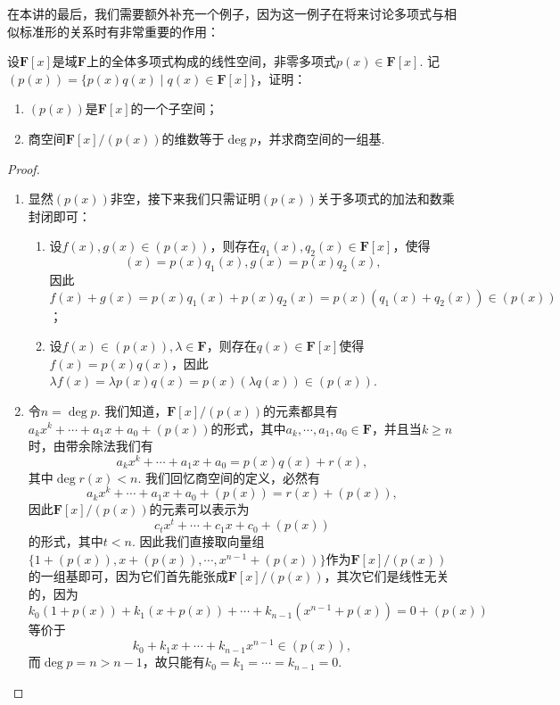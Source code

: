 在本讲的最后，我们需要额外补充一个例子，因为这一例子在将来讨论多项式与相似标准形的关系时有非常重要的作用：
\begin{example} \label{ex:14:多项式域扩张}
    设$\mathbf{F}[x]$是域$\mathbf{F}$上的全体多项式构成的线性空间，非零多项式$p(x)\in \mathbf{F}[x]$. 记$(p(x))=\{p(x)q(x)\mid q(x)\in \mathbf{F}[x]\}$，证明：
    \begin{enumerate}
        \item $(p(x))$是$\mathbf{F}[x]$的一个子空间；
        \item 商空间$\mathbf{F}[x]/(p(x))$的维数等于$\deg p$，并求商空间的一组基.
    \end{enumerate}
\end{example}
\begin{proof}
    \begin{enumerate}
        \item 显然$(p(x))$非空，接下来我们只需证明$(p(x))$关于多项式的加法和数乘封闭即可：
        \begin{enumerate}
            \item 设$f(x),g(x)\in(p(x))$，则存在$q_1(x),q_2(x)\in\mathbf{F}[x]$，使得
            \[(x)=p(x)q_1(x),g(x)=p(x)q_2(x),\]
            因此$f(x)+g(x)=p(x)q_1(x)+p(x)q_2(x)=p(x)(q_1(x)+q_2(x))\in(p(x))$；
            \item 设$f(x)\in(p(x)),\lambda\in\mathbf{F}$，则存在$q(x)\in\mathbf{F}[x]$使得$f(x)=p(x)q(x)$，因此$\lambda f(x)=\lambda p(x)q(x)=p(x)(\lambda q(x))\in(p(x))$.
        \end{enumerate}
        \item 令$n=\deg p$. 我们知道，$\mathbf{F}[x]/(p(x))$的元素都具有$a_kx^k+\cdots+a_1x+a_0+(p(x))$的形式，其中$a_k,\cdots,a_1,a_0\in\mathbf{F}$，并且当$k\geqslant n$时，由带余除法我们有
        \[a_kx^k+\cdots+a_1x+a_0=p(x)q(x)+r(x),\]
        其中$\deg r(x)<n$. 我们回忆商空间的定义，必然有
        \[a_kx^k+\cdots+a_1x+a_0+(p(x))=r(x)+(p(x)),\]
        因此$\mathbf{F}[x]/(p(x))$的元素可以表示为
        \[c_tx^t+\cdots+c_1x+c_0+(p(x))\]
        的形式，其中$t<n$. 因此我们直接取向量组$\{1+(p(x)),x+(p(x)),\cdots,x^{n-1}+(p(x))\}$作为$\mathbf{F}[x]/(p(x))$的一组基即可，因为它们首先能张成$\mathbf{F}[x]/(p(x))$，其次它们是线性无关的，因为
        \[k_0(1+p(x))+k_1(x+p(x))+\cdots+k_{n-1}(x^{n-1}+p(x))=0+(p(x))\]
        等价于
        \[k_0+k_1x+\cdots+k_{n-1}x^{n-1}\in(p(x)),\]
        而$\deg p=n>n-1$，故只能有$k_0=k_1=\cdots=k_{n-1}=0$.
    \end{enumerate}
\end{proof}

